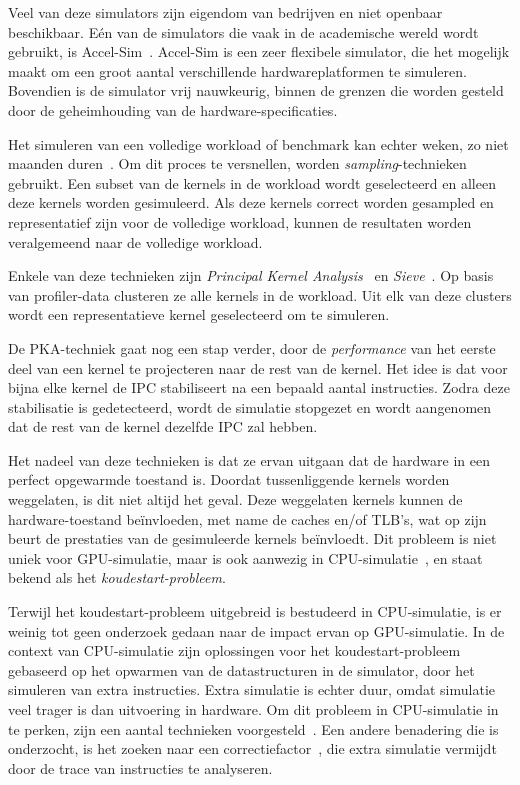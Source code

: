 \documentclass[5p,numvwe]{elsarticle}
\begin{document}
    Veel van deze simulators zijn eigendom van bedrijven en niet openbaar beschikbaar.
    Eén van de simulators die vaak in de academische wereld wordt gebruikt, is Accel-Sim~\cite{accelsim}.
    Accel-Sim is een zeer flexibele simulator, die het mogelijk maakt om een groot aantal verschillende hardwareplatformen te simuleren.
    Bovendien is de simulator vrij nauwkeurig, binnen de grenzen die worden gesteld door de geheimhouding van de hardware-specificaties.

    Het simuleren van een volledige workload of benchmark kan echter weken, zo niet maanden duren~\cite{pks}.
    Om dit proces te versnellen, worden \textit{sampling}-technieken gebruikt.
    Een subset van de kernels in de workload wordt geselecteerd en alleen deze kernels worden gesimuleerd.
    Als deze kernels correct worden gesampled en representatief zijn voor de volledige workload, kunnen de resultaten worden veralgemeend naar de volledige workload.

    Enkele van deze technieken zijn \textit{Principal Kernel Analysis}~\cite{pks} en \textit{Sieve}~\cite{sieve}.
    Op basis van profiler-data clusteren ze alle kernels in de workload.
    Uit elk van deze clusters wordt een representatieve kernel geselecteerd om te simuleren.

    De PKA-techniek gaat nog een stap verder, door de \textit{performance} van het eerste deel van een kernel te projecteren naar de rest van de kernel.
    Het idee is dat voor bijna elke kernel de IPC stabiliseert na een bepaald aantal instructies.
    Zodra deze stabilisatie is gedetecteerd, wordt de simulatie stopgezet en wordt aangenomen dat de rest van de kernel dezelfde IPC zal hebben.

    Het nadeel van deze technieken is dat ze ervan uitgaan dat de hardware in een perfect opgewarmde toestand is.
    Doordat tussenliggende kernels worden weggelaten, is dit niet altijd het geval.
    Deze weggelaten kernels kunnen de hardware-toestand beïnvloeden, met name de caches en/of TLB's, wat op zijn beurt de prestaties van de gesimuleerde kernels beïnvloedt.
    Dit probleem is niet uniek voor GPU-simulatie, maar is ook aanwezig in CPU-simulatie~\cite{blrl}, en staat bekend als het \textit{koudestart-probleem}.

    Terwijl het koudestart-probleem uitgebreid is bestudeerd in CPU-simulatie, is er weinig tot geen onderzoek gedaan naar de impact ervan op GPU-simulatie.
    In de context van CPU-simulatie zijn oplossingen voor het koudestart-probleem gebaseerd op het opwarmen van de datastructuren in de simulator, door het simuleren van extra instructies.
    Extra simulatie is echter duur, omdat simulatie veel trager is dan uitvoering in hardware.
    Om dit probleem in CPU-simulatie in te perken, zijn een aantal technieken voorgesteld~\cite{cpu-checkpoint,cpu-stitch-prime,cpu-merge-stitch-prime,cpu-nsl,cpu-mse,cpu-mrrl,blrl}.
    Een andere benadering die is onderzocht, is het zoeken naar een correctiefactor~\cite{cpu-corr-fac}, die extra simulatie vermijdt door de trace van instructies te analyseren.
\end{document}
